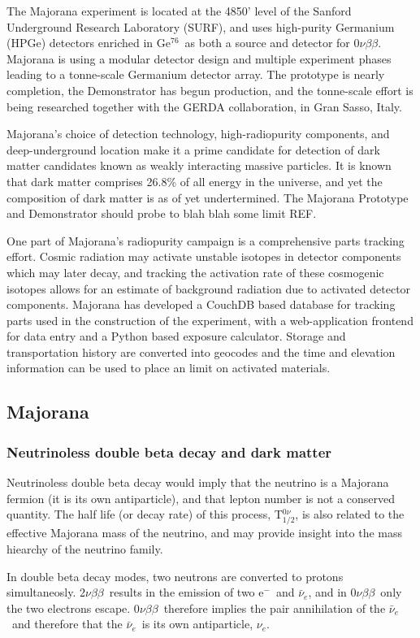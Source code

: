 \documentclass[journal]{IEEEtran}
\def\znbb{0$\nu\beta\beta$}
\def\tnbb{2$\nu\beta\beta$}
\def\elec{e$^{-}$}
\def\elanu{$\bar{\nu}_{e}$}
\def\elnu{$\nu_{e}$}
\def\Tznbb{T$^{0\nu}_{1/2}$}
\def\enrGe{Ge$^{76}$}
\begin{document}
The Majorana experiment is located at the 4850' level of the Sanford Underground
Research Laboratory (SURF), and uses high-purity Germanium (HPGe) detectors enriched in
\enrGe\ as both a source and detector for \znbb. Majorana is using a modular
detector design and multiple experiment phases leading to a tonne-scale Germanium
detector array. The prototype is nearly completion, the Demonstrator has begun
production, and the tonne-scale effort is being researched together with the GERDA 
collaboration, in Gran Sasso, Italy.

Majorana's choice of detection technology, high-radiopurity components, and deep-underground
location make it a prime candidate for detection of dark matter candidates known as weakly
interacting massive particles. It is known that dark matter comprises 26.8\% of all energy
in the universe, and yet the composition of dark matter is as of yet undertermined. The
Majorana Prototype and Demonstrator should probe to blah blah some limit REF.

One part of Majorana's radiopurity campaign is a comprehensive parts tracking effort. Cosmic
radiation may activate unstable isotopes in detector components which may later decay, and 
tracking the activation rate of these cosmogenic isotopes allows for an estimate of background
radiation due to activated detector components. Majorana has developed a CouchDB based database
for tracking parts used in the construction of the experiment, with a web-application frontend
for data entry and a Python based exposure calculator. Storage and transportation history are
converted into geocodes and the time and elevation information can be used to place an limit
on activated materials.

\subsection{Majorana}
\subsubsection{Neutrinoless double beta decay and dark matter}
Neutrinoless double beta decay would imply that the neutrino is a Majorana fermion (it is its own
antiparticle), and that lepton number is not a conserved quantity. 
The half life (or decay rate) of this process, \Tznbb, is also
related to the effective Majorana mass of the neutrino, and may
provide insight into the mass hiearchy of the neutrino family.

In double beta decay modes, two neutrons are converted to protons
simultaneosly. \tnbb\ results in the emission of two \elec\ and \elanu, and
in \znbb\ only the two electrons escape. \znbb\ therefore implies the pair
annihilation of the \elanu\ and therefore that the \elanu\ is its own
antiparticle, \elnu.
\end{document}
